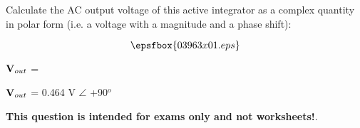 

Calculate the AC output voltage of this active integrator as a complex quantity in polar form (i.e. a voltage with a magnitude and a phase shift):

$$\epsfbox{03963x01.eps}$$

${\bf V}_{out}$ =







${\bf V}_{out}$ = 0.464 V $\angle$ +90$^{o}$







{\bf This question is intended for exams only and not worksheets!}.



